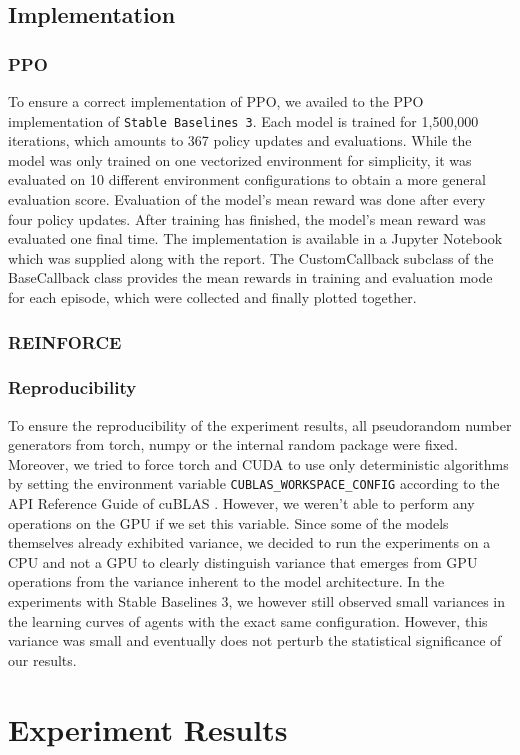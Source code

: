 \documentclass[a4paper, 11pt]{article}
\begin{document}
	\subsection{Implementation}
	\subsubsection{PPO}
	To ensure a correct implementation of PPO, we availed to the PPO implementation of \texttt{Stable Baselines 3}. 
	Each model is trained for 1,500,000 iterations, which amounts to 367 policy updates and evaluations. While the model was only trained on one vectorized environment for simplicity, it was evaluated on 10 different environment configurations to obtain a more general evaluation score. Evaluation of the model's mean reward was done after every four policy updates. After training has finished, the model's mean reward was evaluated one final time.
	The implementation is available in a Jupyter Notebook which was supplied along with the report.
	The CustomCallback subclass of the BaseCallback class provides the mean rewards in training and evaluation mode for each episode, which were collected and finally plotted together.
	\subsubsection{REINFORCE}
	\subsubsection{Reproducibility}
	To ensure the reproducibility of the experiment results, all pseudorandom number generators from torch, numpy or the internal random package were fixed. Moreover, we tried to force torch and CUDA to use only deterministic algorithms by setting the environment variable \texttt{CUBLAS\_WORKSPACE\_CONFIG} according to the API Reference Guide of cuBLAS \cite{Nvid.CUDA}. However, we weren't able to perform any operations on the GPU if we set this variable. 
	Since some of the models themselves already exhibited variance, we decided to run the experiments on a CPU and not a GPU to clearly distinguish variance that emerges from GPU operations from the variance inherent to the model architecture.
	In the experiments with Stable Baselines 3, we however still observed small variances in the learning curves of agents with the exact same configuration. However, this variance was small and eventually does not perturb the statistical significance of our results.
	\section{Experiment Results}
\end{document}
